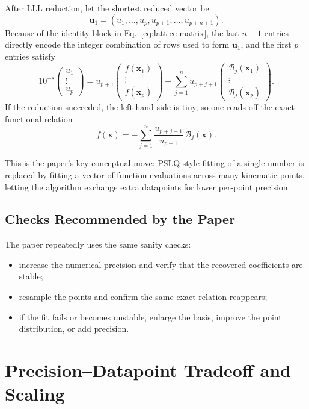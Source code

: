 \documentclass[11pt]{article}
\newcommand{\cB}{\mathcal{B}}
\newcommand{\bx}{\mathbf{x}}
\begin{document}
After LLL reduction, let the shortest reduced vector be
\[
\mathbf{u}_1=(u_1,\ldots,u_p,u_{p+1},\ldots,u_{p+n+1}).
\]
Because of the identity block in Eq.~\eqref{eq:lattice-matrix}, the last $n+1$ entries directly encode the integer combination of rows used to form $\mathbf{u}_1$, and the first $p$ entries satisfy
\begin{equation}
10^{-s}
\begin{pmatrix}
u_1\\
\vdots\\
u_p
\end{pmatrix}
=
u_{p+1}
\begin{pmatrix}
f(\bx_1)\\
\vdots\\
f(\bx_p)
\end{pmatrix}
+
\sum_{j=1}^{n} u_{p+j+1}
\begin{pmatrix}
\cB_j(\bx_1)\\
\vdots\\
\cB_j(\bx_p)
\end{pmatrix}.
\label{eq:lll-relation}
\end{equation}
If the reduction succeeded, the left-hand side is tiny, so one reads off the exact functional relation
\begin{equation}
f(\bx)= -\sum_{j=1}^{n}\frac{u_{p+j+1}}{u_{p+1}}\,\cB_j(\bx).
\label{eq:final-fit}
\end{equation}

This is the paper's key conceptual move: PSLQ-style fitting of a single number is replaced by fitting a vector of function evaluations across many kinematic points, letting the algorithm exchange extra datapoints for lower per-point precision.

\subsection{Checks Recommended by the Paper}
The paper repeatedly uses the same sanity checks:
\begin{itemize}
    \item increase the numerical precision and verify that the recovered coefficients are stable;
    \item resample the points and confirm the same exact relation reappears;
    \item if the fit fails or becomes unstable, enlarge the basis, improve the point distribution, or add precision.
\end{itemize}

\section{Precision--Datapoint Tradeoff and Scaling}
\end{document}

